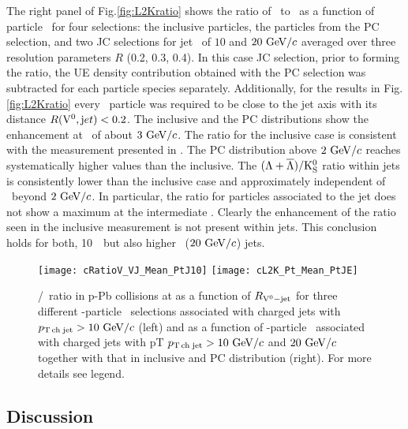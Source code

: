 The right panel of Fig.\ref{fig:L2Kratio} shows the ratio of \lda\ to \ks\ as a function of particle \pt\ for four selections: the inclusive particles, the particles from the PC selection, and two JC selections for jet \pt\ of $10$ and $20~\mathrm{GeV}/c$ averaged over three resolution parameters $R$ (0.2, 0.3, 0.4). 
In this case JC selection, prior to forming the ratio, the UE density contribution obtained with the PC selection was subtracted for each particle species separately.
Additionally, for the results in Fig. \ref{fig:L2Kratio} every \Vzero\ particle was required to be close to the jet axis with its distance $R({\rm V}^0,{\mathrm jet}) < 0.2$.
The inclusive and the PC distributions show the enhancement at \pt\ of about $3~\mathrm{GeV}/c$. 
The ratio for the inclusive case is consistent with the measurement presented in \cite{Abelev:2013haa}.
The PC distribution above $2~\mathrm{GeV}/c$ reaches systematically higher values than the inclusive. 
The $(\Lambda+\overline{\Lambda})/\rm{K}^{0}_{\rm S}$ ratio within jets is consistently lower than the inclusive case and approximately independent of \pt\ beyond $2~\mathrm{GeV}/c$.
In particular, the ratio for particles associated to the jet does not show a maximum at the intermediate \pt.
Clearly the enhancement of the ratio seen in the inclusive measurement is not present within jets.
This conclusion holds for both, 10~\gevc\ but also higher \pt\ ($20~\mathrm{GeV}/c$) jets.

\begin{figure}[htbp]
	\centering
	\texttt{[image: cRatioV\_VJ\_Mean\_PtJ10]}
	\texttt{[image: cL2K\_Pt\_Mean\_PtJE]}
	\caption{\lda/\ks\ ratio in p-Pb collisions at  as a function of $R_{{\rm V}^{0}-{\rm jet}}$ for three different \Vzero-particle \pt\ selections associated with charged jets with $p_\mathrm{T\,ch\;jet}>10~\mathrm{GeV}/c$ (left) and as a function of \Vzero-particle \pt\ associated with charged jets with pT $p_\mathrm{T\,ch\;jet}>10~\mathrm{GeV}/c$ and $20~\mathrm{GeV}/c$ together with that in inclusive and PC distribution (right). For more details see legend.}
	\label{fig:L2Kratio}
	\label{fig:LKR}
\end{figure}

\subsection{Discussion}

